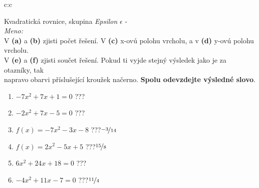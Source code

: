 \documentclass[10pt]{report}
\begin{document}
\clearpage
\thispagestyle{empty}
\begin{tabular}{c:c}
\begin{minipage}[c][99mm][t]{0.49\linewidth}
\begin{center}
\vspace{7mm}
{\huge Kvadratická rovnice, skupina \textit{Epsilon $\epsilon$} -}\\[4.5mm]
\textit{Meno:}\phantom{xxxxxxxxxxxxxxxxxxxxxxxxxxxxxxxxxxxxxxxxxxxxxxxxxxxxxxxxxxxxxxxxx}\\[3.5mm]
V \textbf{(a)} a \textbf{(b)} zjisti počet řešení. V \textbf{(c)} x-ovú polohu vrcholu, a v \textbf{(d)} y-ovú polohu vrcholu.\\V \textbf{(e)} a \textbf{(f)} zjisti součet řešení. Pokud ti vyjde stejný výsledek jako je za otazníky, tak\\napravo obarvi příslušející kroužek načerno. \textbf{Spolu odevzdejte výsledné slovo}.\\[3mm]
\begin{minipage}{0.77\linewidth}
\begin{center}
\begin{varwidth}{\textwidth}
\begin{enumerate}
\large
\item $-7x^2+7x+1=0$\quad \dotfill\; ???\;\dotfill {}
\item $-2x^2+7x-5=0$\quad \dotfill\; ???\;\dotfill {}
\item $f(x)=-7x^2-3x-8$\quad \dotfill\; ???\;\dotfill \quad $\nicefrac{-3}{14}$
\item $f(x)=2x^2-5x+5$\quad \dotfill\; ???\;\dotfill \quad $\nicefrac{15}{8}$
\item $6x^2+24x+18=0$\quad \dotfill\; ???\;\dotfill {}
\item $-4x^2+11x-7=0$\quad \dotfill\; ???\;\dotfill \quad $\nicefrac{11}{4}$
\end{enumerate}
\end{varwidth}
\end{center}
\end{minipage}

\end{center}
\end{minipage}
\end{tabular}
\end{document}
